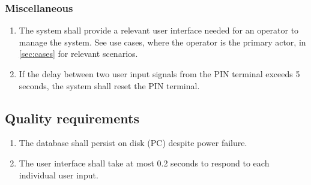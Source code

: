 \documentclass[12pt,titlepage,bibliography=totoc]{article}
\begin{document}
\subsubsection{Miscellaneous}
\begin{enumerate}
	\item The system shall provide a relevant user interface needed for an operator to manage the system. See use cases, where the operator is the primary actor, in \cref{sec:cases} for relevant scenarios.
	\item If the delay between two user input signals from the PIN terminal exceeds 5 seconds, the system shall reset the PIN terminal.
\end{enumerate}
\subsection{Quality requirements}
\begin{enumerate}
	\item The database shall persist on disk (PC) despite power failure.
	\item The user interface shall take at most 0.2 seconds to respond to each individual user input.
\end{enumerate}
{}


\end{document}
